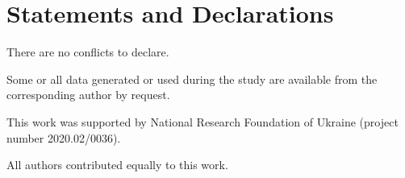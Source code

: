 \documentclass[sn-mathphys]{sn-jnl}%
\theoremstyle{thmstyleone}%
\theoremstyle{thmstyletwo}%
\theoremstyle{thmstylethree}%
\begin{document}
\section*{Statements and Declarations}

There are no conflicts to declare.

Some or all data generated or used during the study are available from the corresponding author by request.

This work was supported by National Research Foundation  of Ukraine (project number 2020.02/0036).

All authors contributed equally to this work.

%
%




\end{document}
